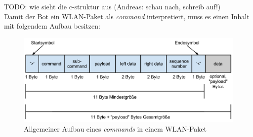 TODO: wie sieht die c-struktur aus (Andreas: schau nach, schreib auf!)\\

Damit der Bot ein WLAN-Paket als \textit{command} interpretiert, muss es einen Inhalt mit folgendem Aufbau besitzen:
\begin{figure}[H]
	\centering
	\includegraphics[scale=0.5]{pic/ctBotWlanAllgemein}
	\caption{Allgemeiner Aufbau eines \textit{commands} in einem WLAN-Paket}
	\label{ctBotWlanAllgemein}
\end{figure}


